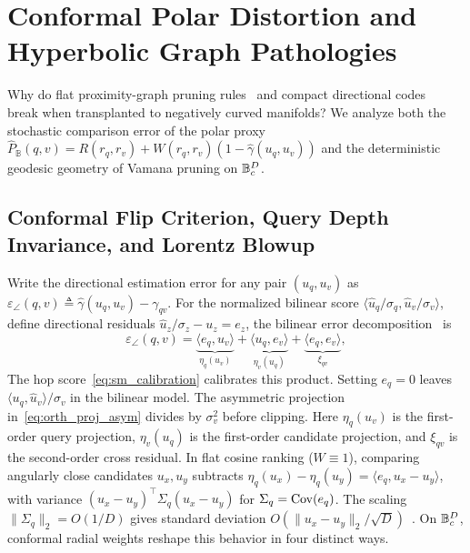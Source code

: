 \section{Conformal Polar Distortion and Hyperbolic Graph Pathologies}
\label{sec:theory}

Why do flat proximity-graph pruning rules~\cite{subramanya2019diskann} and compact directional codes~\cite{xiao2026quiver,xiao2026decisions} break when transplanted to negatively curved manifolds?
We analyze both the stochastic comparison error of the polar proxy $\widehat{P}_{\mathbb{B}}(q, v) = R(r_q, r_v) + W(r_q, r_v)(1 - \hat{\gamma}(u_q, u_v))$ and the deterministic geodesic geometry of {Vamana} pruning on $\mathbb{B}_c^D$.

\subsection{Conformal Flip Criterion, Query Depth Invariance, and Lorentz Blowup}
\label{subsec:non_cancellation}

Write the directional estimation error for any pair $(u_q, u_v)$ as $\varepsilon_\angle(q, v) \triangleq \hat{\gamma}(u_q, u_v) - \gamma_{qv}$.
For the normalized bilinear score $\langle\hat u_q/\sigma_q,\hat u_v/\sigma_v\rangle$, define directional residuals $\hat{u}_z / \sigma_z - u_z = e_z$, the bilinear error decomposition~\cite{bussgang1952crosscorrelation,xiao2026decisions} is
\begin{equation}
  \varepsilon_\angle(q, v)
  = \underbrace{\langle e_q, u_v\rangle}_{\eta_q(u_v)}
  + \underbrace{\langle u_q, e_v\rangle}_{\eta_v(u_q)}
  + \underbrace{\langle e_q, e_v\rangle}_{\xi_{qv}},
  \label{eq:bilinear_error}
\end{equation}
The hop score~\eqref{eq:sm_calibration} calibrates this product. Setting $e_q=0$ leaves $\langle u_q,\hat u_v\rangle/\sigma_v$ in the bilinear model. The asymmetric projection in~\eqref{eq:orth_proj_asym} divides by $\sigma_v^2$ before clipping. Here $\eta_q(u_v)$ is the first-order query projection, $\eta_v(u_q)$ is the first-order candidate projection, and $\xi_{qv}$ is the second-order cross residual.
In flat cosine ranking ($W \equiv 1$), comparing angularly close candidates $u_x, u_y$ subtracts $\eta_q(u_x) - \eta_q(u_y) = \langle e_q, u_x - u_y\rangle$, with variance $(u_x-u_y)^\top\Sigma_q(u_x-u_y)$ for $\Sigma_q=\operatorname{Cov}(e_q)$. The scaling $\|\Sigma_q\|_2=O(1/D)$ gives standard deviation $O(\|u_x-u_y\|_2/\sqrt D)$~\cite{xiao2026decisions}.
On $\mathbb{B}_c^D$, conformal radial weights reshape this behavior in four distinct ways.


